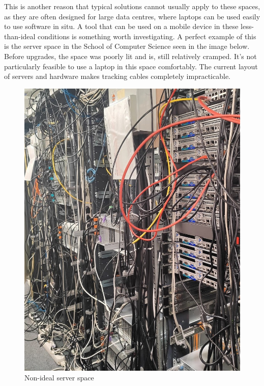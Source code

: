 \documentclass [12pt,letterpaper]{article}
\begin{document}
This is another reason that typical solutions cannot usually apply to these spaces, as they are often designed for large data centres, where laptops can be used easily to use software in situ. A tool that can be used on a mobile device in these less-than-ideal conditions is something worth investigating. A perfect example of this is the server space in the School of Computer Science seen in the image below. Before upgrades, the space was poorly lit and is, still relatively cramped. It’s not particularly feasible to use a laptop in this space comfortably. The current layout of servers and hardware makes tracking cables completely impracticable.

\begin{figure}
    \centering
\begin{minipage}{.48\linewidth}
    \includegraphics[width=\linewidth]{images/server_racks.jpg}
    \caption{Non-ideal server space}
    \label{"fig: Non-ideal server space"}
\end{minipage}
\hfill

\end{figure}
\end{document}
